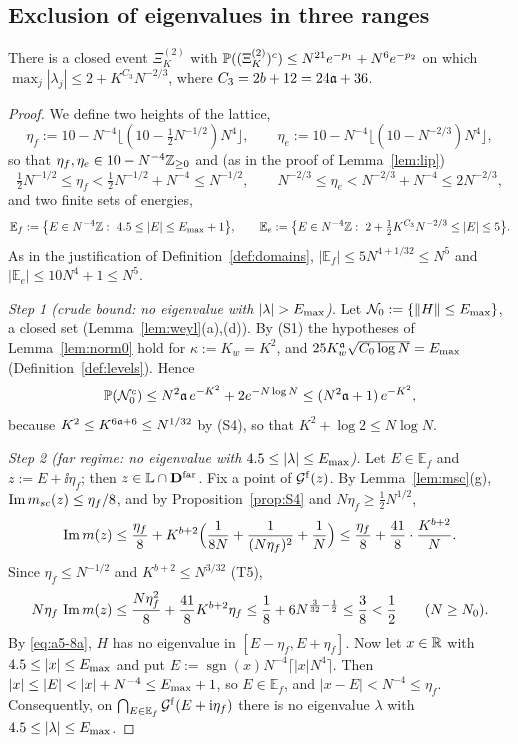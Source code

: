 \subsection{Exclusion of eigenvalues in three ranges}
\begin{proposition}\label{prop:norm}
There is a closed event $\Xi_K^{(2)}$ with $\mathbb{P}((\Xi_K^{(2)})^c)\le N^{21}e^{-p_1}+N^{6}e^{-p_2}$ on which $\max_j|\lambda_j|\le2+K^{C_3}N^{-2/3}$, where $C_3=2b+12=24\mathfrak{a}+36$.
\end{proposition}
\begin{proof}
We define two heights of the lattice,
\[
 \eta_f:=10-N^{-4}\big\lfloor(10-\tfrac12N^{-1/2})N^4\big\rfloor,\qquad\eta_e:=10-N^{-4}\big\lfloor(10-N^{-2/3})N^4\big\rfloor ,
\]
so that $\eta_f,\eta_e\in10-N^{-4}\mathbb{Z}_{\ge0}$ and (as in the proof of Lemma~\ref{lem:lip})
\[
 \tfrac12N^{-1/2}\le\eta_f<\tfrac12N^{-1/2}+N^{-4}\le N^{-1/2},\qquad N^{-2/3}\le\eta_e<N^{-2/3}+N^{-4}\le2N^{-2/3},
\]
and two finite sets of energies,
\[
 \mathbb E_f:=\big\{E\in N^{-4}\Z:\ 4.5\le|E|\le\Emax+1\big\},\qquad\mathbb E_e:=\big\{E\in N^{-4}\Z:\ 2+\tfrac12K^{C_3}N^{-2/3}\le|E|\le5\big\}.
\]
As in the justification of Definition~\ref{def:domains}, $|\mathbb E_f|\le5N^{4+1/32}\le N^5$ and $|\mathbb E_e|\le10N^4+1\le N^5$.

\emph{Step 1 (crude bound: no eigenvalue with $|\lambda|>\Emax$).} Let $\mathcal N_0:=\{\|H\|\le E_{\max}\}$, a closed set (Lemma~\ref{lem:weyl}(a),(d)). By (S1) the hypotheses of Lemma~\ref{lem:norm0} hold for $\kappa:=K_w=K^2$, and $25K_w^{\mathfrak{a}}\sqrt{C_0\log N}=E_{\max}$ (Definition~\ref{def:levels}). Hence
\[
 \mathbb{P}(\mathcal N_0^c)\le N^2\mathfrak{a}\,e^{-K^2}+2e^{-N\log N}\le(N^2\mathfrak{a}+1)\,e^{-K^2},
\]
because $K^2\le K^{6\mathfrak{a}+6}\le N^{1/32}$ by (S4), so that $K^2+\log2\le N\log N$.

\emph{Step 2 (far regime: no eigenvalue with $4.5\le|\lambda|\le E_{\max}$).} Let $E\in\mathbb E_f$ and $z:=E+\ii\eta_f$; then $z\in\mathbb L\cap\mathbf{D}^{\rm far}$. Fix a point of $\mathcal{G}^{\rm f}(z)$. By Lemma~\ref{lem:msc}(g), $\operatorname{Im}m_{sc}(z)\le\eta_f/8$, and by Proposition~\ref{prop:S4} and $N\eta_f\ge\frac12N^{1/2}$,
\[
 \operatorname{Im} m(z)\le\frac{\eta_f}8+K^{b+2}\Big(\frac1{8N}+\frac1{(N\eta_f)^2}+\frac1N\Big)\le\frac{\eta_f}8+\frac{41}{8}\cdot\frac{K^{b+2}}{N}.
\]
Since $\eta_f\le N^{-1/2}$ and $K^{b+2}\le N^{3/32}$ (T5),
\[
 N\eta_f\,\operatorname{Im} m(z)\le\frac{N\eta_f^2}8+\frac{41}{8}K^{b+2}\eta_f\le\frac18+6N^{\frac3{32}-\frac12}\le\frac38<\frac12\qquad(N\ge N_0).
\]
By \eqref{eq:a5-8a}, $H$ has no eigenvalue in $[E-\eta_f,E+\eta_f]$. Now let $x\in\mathbb{R}$ with $4.5\le|x|\le E_{\max}$ and put $E:=\operatorname{sgn}(x)N^{-4}\lceil|x|N^4\rceil$. Then $|x|\le|E|<|x|+N^{-4}\le\Emax+1$, so $E\in\mathbb E_f$, and $|x-E|<N^{-4}\le\eta_f$.
Consequently, on $\bigcap_{E\in\mathbb E_f}\mathcal{G}^{\rm f}(E+\mathrm{i}\eta_f)$ there is no eigenvalue $\lambda$ with $4.5\le|\lambda|\le E_{\max}$.


\end{proof}
